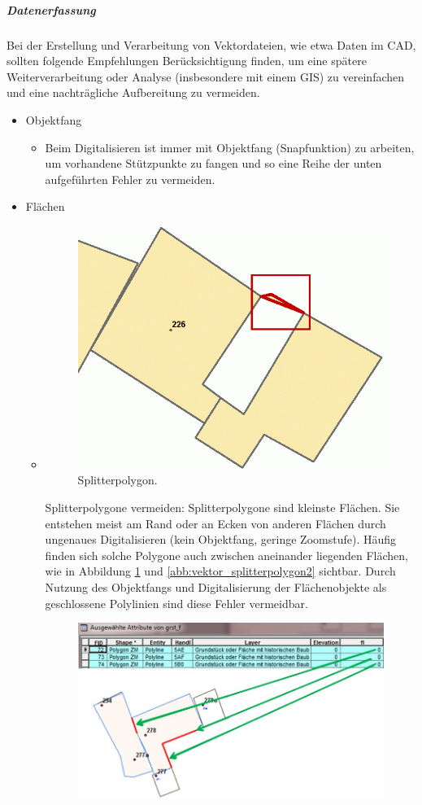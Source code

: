 \subparagraph{Datenerfassung}
Bei der Erstellung und Verarbeitung von Vektordateien, wie etwa Daten im CAD, sollten folgende Empfehlungen Berücksichtigung finden, um eine spätere Weiterverarbeitung oder Analyse (insbesondere mit einem GIS) zu vereinfachen und eine nachträgliche Aufbereitung zu vermeiden.

\newlength{\strutheight}
\settoheight{\strutheight}{\strut} 
\begin{itemize}
	\item Objektfang
	\begin{itemize}
		\item Beim Digitalisieren ist immer mit Objektfang (Snapfunktion) zu arbeiten, um vorhandene Stützpunkte zu fangen und so eine Reihe der unten aufgeführten Fehler zu vermeiden.
	\end{itemize}
	\item Flächen
	\begin{itemize}
		\item \begin{adjustbox}{valign=T,raise=\strutheight,minipage={\linewidth}}
      \begin{figure}
        \includegraphics[width=0.3\linewidth]{bilder/vektor_splitterpolygon}
				\caption{Splitterpolygon.}
				\label{abb:vektor_splitterpolygon}
      \end{figure}
    \strut{}Splitterpolygone vermeiden: Splitterpolygone sind kleinste Flächen. Sie entstehen meist am Rand oder an Ecken von anderen Flächen durch ungenaues Digitalisieren (kein Objektfang, geringe Zoomstufe). \newline
		Häufig finden sich solche Polygone auch zwischen aneinander liegenden Flächen, wie in Abbildung \ref{abb:vektor_splitterpolygon} und \ref{abb:vektor_splitterpolygon2} sichtbar. Durch Nutzung des Objektfangs und Digitalisierung der Flächenobjekte als geschlossene Polylinien sind diese Fehler vermeidbar.
    \end{adjustbox}
		\begin{figure}[h!tb]
			\centering
			\includegraphics[width=.7\linewidth]{bilder/vektor_splitterpolygon2}

\end{figure}
\end{itemize}
\end{itemize}
